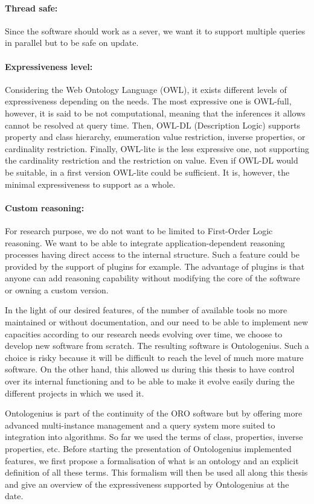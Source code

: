 \paragraph{Thread safe:} Since the software should work as a sever, we want it to support multiple queries in parallel but to be safe on update.

\paragraph{Expressiveness level:} Considering the Web Ontology Language (OWL), it exists different levels of expressiveness depending on the needs. The most expressive one is OWL-full, however, it is said to be not computational, meaning that the inferences it allows cannot be resolved at query time. Then, OWL-DL (Description Logic) supports property and class hierarchy, enumeration value restriction, inverse properties, or cardinality restriction. Finally, OWL-lite is the less expressive one, not supporting the cardinality restriction and the restriction on value. Even if OWL-DL would be suitable, in a first version OWL-lite could be sufficient. It is, however, the minimal expressiveness to support as a whole.

\paragraph{Custom reasoning:} For research purpose, we do not want to be limited to First-Order Logic reasoning. We want to be able to integrate application-dependent reasoning processes having direct access to the internal structure. Such a feature could be provided by the support of plugins for example. The advantage of plugins is that anyone can add reasoning capability without modifying the core of the software or owning a custom version.

In the light of our desired features, of the number of available tools no more maintained or without documentation, and our need to be able to implement new capacities according to our research needs evolving over time, we choose to develop new software from scratch. The resulting software is Ontologenius. Such a choice is risky because it will be difficult to reach the level of much more mature software. On the other hand, this allowed us during this thesis to have control over its internal functioning and to be able to make it evolve easily during the different projects in which we used it.

Ontologenius is part of the continuity of the ORO software but by offering more advanced multi-instance management and a query system more suited to integration into algorithms. So far we used the terms of class, properties, inverse properties, etc. Before starting the presentation of Ontologenius implemented features, we first propose a formalisation of what is an ontology and an explicit definition of all these terms. This formalism will then be used all along this thesis and give an overview of the expressiveness supported by Ontologenius at the date.

